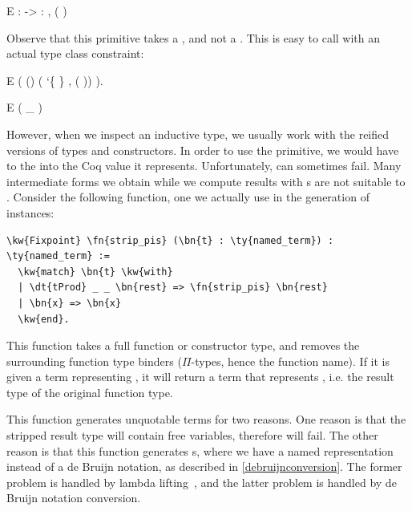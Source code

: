 \begin{SaveVerbatim}{E}
     :  -> 
         : , \TemplateMonad{} ( )
\end{SaveVerbatim}

\newpage
Observe that this \TemplateMonad{} \gls{primitive} takes a , and not a . This is easy to call with an actual type class constraint:

\vspace{.2in}
\begin{SaveVerbatim}{E}
 ( () 
                             (  `\{ \} ,
                               (  ))
             \fn{>>}\fn{=} ).
\end{SaveVerbatim}

\begin{SaveVerbatim}{E}
( _ )
\end{SaveVerbatim}

However, when we inspect an \gls{inductive type}, we usually work with the reified versions of types and constructors. In order to use the  \gls{primitive}, we would have to \unquote{} the  into the Coq value it represents. Unfortunately, \unquoting{} can sometimes fail. Many intermediate forms we obtain while we compute results with s are not suitable to \unquoting{}. Consider the following function, one we actually use in the generation of \GraphPredicate{} instances:

\begin{Verbatim}
\kw{Fixpoint} \fn{strip_pis} (\bn{t} : \ty{named_term}) : \ty{named_term} :=
  \kw{match} \bn{t} \kw{with}
  | \dt{tProd} _ _ \bn{rest} => \fn{strip_pis} \bn{rest}
  | \bn{x} => \bn{x}
  \kw{end}.
\end{Verbatim}

This function takes a full function or constructor type, and removes the surrounding function type binders ($\Pi$-types, hence the function name). If it is given a term representing , it will return a term that represents , i.e. the result type of the original function type.

This function generates unquotable terms for two reasons. One reason is that the stripped result type will contain free variables, therefore \unquoting{} will fail. The other reason is that this function generates s, where we have a named representation instead of a de Bruijn notation, as described in \autoref{debruijnconversion}.
The former problem is handled by lambda lifting~\cite{johnsson1985lambda}, and the latter problem is handled by de Bruijn notation conversion. 

